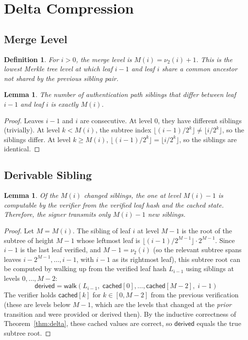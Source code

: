 \documentclass[11pt]{article}
\newtheorem{lemma}[theorem]{Lemma}
\newtheorem{definition}[theorem]{Definition}
\begin{document}
\section{Delta Compression}\label{sec:delta}

\subsection{Merge Level}

\begin{definition}
For $i > 0$, the \emph{merge level} is $M(i) = \nu_2(i) + 1$. This is
the lowest Merkle tree level at which leaf $i - 1$ and leaf $i$ share a
common ancestor \emph{not} shared by the previous sibling pair.
\end{definition}

\begin{lemma}\label{lem:changed}
The number of authentication path siblings that differ between leaf
$i - 1$ and leaf $i$ is exactly $M(i)$.
\end{lemma}

\begin{proof}
Leaves $i - 1$ and $i$ are consecutive. At level $0$, they have
different siblings (trivially). At level $k < M(i)$, the subtree index
$\lfloor (i-1) / 2^k \rfloor \neq \lfloor i / 2^k \rfloor$, so the
siblings differ. At level $k \geq M(i)$, $\lfloor (i-1) / 2^k \rfloor
= \lfloor i / 2^k \rfloor$, so the siblings are identical.
\end{proof}

\subsection{Derivable Sibling}

\begin{lemma}\label{lem:derivable}
Of the $M(i)$ changed siblings, the one at level $M(i) - 1$ is
computable by the verifier from the verified leaf hash and the cached
state. Therefore, the signer transmits only $M(i) - 1$ new siblings.
\end{lemma}

\begin{proof}
Let $M = M(i)$. The sibling of leaf $i$ at level $M - 1$ is the root
of the subtree of height $M - 1$ whose leftmost leaf is
$\lfloor (i-1) / 2^{M-1} \rfloor \cdot 2^{M-1}$. Since $i - 1$ is
the last leaf verified, and $M - 1 = \nu_2(i)$ (so the relevant
subtree spans leaves $i - 2^{M-1}, \ldots, i - 1$, with $i - 1$ as
its rightmost leaf), this subtree root can be computed by walking up
from the verified leaf hash $L_{i-1}$ using siblings at levels
$0, \ldots, M - 2$:
\[
\mathsf{derived} = \mathsf{walk}(L_{i-1},\;
\mathsf{cached}[0], \ldots, \mathsf{cached}[M-2],\; i-1)
\]
The verifier holds $\mathsf{cached}[k]$ for $k \in [0, M-2]$ from the
previous verification (these are levels below $M - 1$, which are the
levels that changed at the \emph{prior} transition and were provided or
derived then). By the inductive correctness of
Theorem~\ref{thm:delta}, these cached values are correct, so
$\mathsf{derived}$ equals the true subtree root.
\end{proof}
\end{document}
